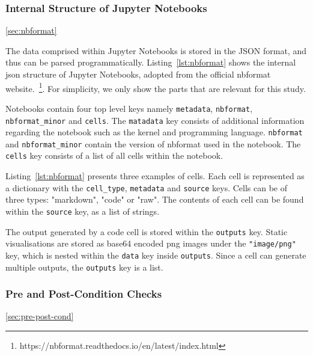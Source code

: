 \documentclass[acmsmall,screen,review,anonymous]{acmart}
\begin{document}
\subsubsection{Internal Structure of Jupyter Notebooks}\ref{sec:nbformat}


\label{lst:nbformat}

The data comprised within Jupyter Notebooks is stored in the JSON format, and thus can be parsed programmatically. Listing~\ref{lst:nbformat} shows the internal json structure of Jupyter Notebooks, adopted from the official nbformat website.~\footnote{https://nbformat.readthedocs.io/en/latest/index.html}. For simplicity, we only show the parts that are relevant for this study.

Notebooks contain four top level keys namely \texttt{metadata}, \texttt{nbformat}, \texttt{nbformat\_minor} and \texttt{cells}. The \texttt{matadata} key consists of additional information regarding the notebook such as the kernel and programming language. \texttt{nbformat} and \texttt{nbformat\_minor} contain the version of nbformat used in the notebook. The \texttt{cells} key consists of a list of all cells within the notebook.

Listing~\ref{lst:nbformat} presents three examples of cells. Each cell is represented as a dictionary with the \texttt{cell\_type}, \texttt{metadata} and \texttt{source} keys. Cells can be of three types: "markdown", "code" or "raw". The contents of each cell can be found within the \texttt{source} key, as a list of strings.

The output generated by a code cell is stored within the \texttt{outputs} key. Static visualisations are stored as base64 encoded png images under the \texttt{"image/png"} key, which is nested within the \texttt{data} key inside \texttt{outputs}. Since a cell can generate multiple outputs, the \texttt{outputs} key is a list.

\subsubsection{Pre and Post-Condition Checks}\ref{sec:pre-post-cond}

\end{document}
